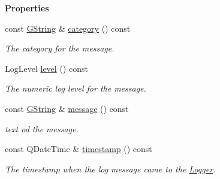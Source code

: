 \begin{Indent}\textbf{ Properties}\par
\begin{DoxyCompactItemize}
\item 
const \mbox{\hyperlink{classrev_1_1_g_string}{G\+String}} \& \mbox{\hyperlink{classrev_1_1_log_record_a1d6b202d4a6b5706cbfd4a042b4b7978}{category}} () const
\begin{DoxyCompactList}\small\item\em The category for the message. \end{DoxyCompactList}\item 
\mbox{\label{classrev_1_1_log_record_aee511a5db62b6e1bf0c521de615230cf}} 
Log\+Level \mbox{\hyperlink{classrev_1_1_log_record_aee511a5db62b6e1bf0c521de615230cf}{level}} () const
\begin{DoxyCompactList}\small\item\em The numeric log level for the message. \end{DoxyCompactList}\item 
\mbox{\label{classrev_1_1_log_record_aa1b89cffc639d7b1b87ac5ca6e787491}} 
const \mbox{\hyperlink{classrev_1_1_g_string}{G\+String}} \& \mbox{\hyperlink{classrev_1_1_log_record_aa1b89cffc639d7b1b87ac5ca6e787491}{message}} () const
\begin{DoxyCompactList}\small\item\em text od the message. \end{DoxyCompactList}\item 
\mbox{\label{classrev_1_1_log_record_ad6020410e8e1eea719c3885b6621de5b}} 
const Q\+Date\+Time \& \mbox{\hyperlink{classrev_1_1_log_record_ad6020410e8e1eea719c3885b6621de5b}{timestamp}} () const
\begin{DoxyCompactList}\small\item\em The timestamp when the log message came to the \mbox{\hyperlink{classrev_1_1_logger}{Logger}}. \end{DoxyCompactList}\end{DoxyCompactItemize}
\end{Indent}

